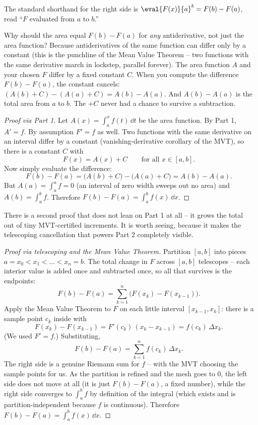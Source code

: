 The standard shorthand for the right side is $\eval{F(x)}{a}^{b}=F(b)-F(a)$, read
``$F$ evaluated from $a$ to $b$.''

\begin{intuitionbox}
Why should the area equal $F(b)-F(a)$ for \emph{any} antiderivative, not just the
area function? Because antiderivatives of the same function can differ only by a
constant (this is the punchline of the Mean Value Theorem -- two functions with
the same derivative march in lockstep, parallel forever). The area function $A$
and your chosen $F$ differ by a fixed constant $C$. When you compute the
difference $F(b)-F(a)$, the constant cancels: $(A(b)+C)-(A(a)+C)=A(b)-A(a)$. And
$A(b)-A(a)$ is the total area from $a$ to $b$. The $+C$ never had a chance to
survive a subtraction.
\end{intuitionbox}

\begin{proof}[Proof via Part 1]
Let $A(x)=\int_a^x f(t)\,\dd t$ be the area function. By Part 1, $A'=f$. By
assumption $F'=f$ as well. Two functions with the same derivative on an interval
differ by a constant (vanishing-derivative corollary of the MVT), so there is a
constant $C$ with
\[
  F(x) = A(x) + C \qquad\text{for all } x\in[a,b].
\]
Now simply evaluate the difference:
\[
  F(b)-F(a) = \big(A(b)+C\big)-\big(A(a)+C\big) = A(b)-A(a).
\]
But $A(a)=\int_a^a f = 0$ (an interval of zero width sweeps out no area) and
$A(b)=\int_a^b f$. Therefore $F(b)-F(a)=\int_a^b f(x)\,\dd x$.
\end{proof}

There is a second proof that does not lean on Part 1 at all -- it grows the total
out of tiny MVT-certified increments. It is worth seeing, because it makes the
telescoping cancellation that powers Part 2 completely visible.

\begin{proof}[Proof via telescoping and the Mean Value Theorem]
Partition $[a,b]$ into pieces $a=x_0<x_1<\dots<x_n=b$. The total change in $F$
across $[a,b]$ telescopes -- each interior value is added once and subtracted
once, so all that survives is the endpoints:
\[
  F(b)-F(a) = \sum_{k=1}^{n}\big(F(x_k)-F(x_{k-1})\big).
\]
Apply the Mean Value Theorem to $F$ on each little interval $[x_{k-1},x_k]$:
there is a sample point $c_k$ inside with
\[
  F(x_k)-F(x_{k-1}) = F'(c_k)\,(x_k-x_{k-1}) = f(c_k)\,\Delta x_k .
\]
(We used $F'=f$.) Substituting,
\[
  F(b)-F(a) = \sum_{k=1}^{n} f(c_k)\,\Delta x_k .
\]
The right side is a genuine Riemann sum for $f$ -- with the MVT choosing the
sample points for us. As the partition is refined and the mesh goes to $0$, the
left side does not move at all (it is just $F(b)-F(a)$, a fixed number), while the
right side converges to $\int_a^b f$ by definition of the integral (which exists
and is partition-independent because $f$ is continuous). Therefore
$F(b)-F(a)=\int_a^b f(x)\,\dd x$.
\end{proof}

